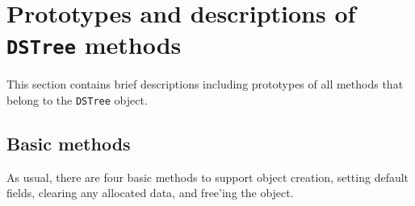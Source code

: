 \par
\section{Prototypes and descriptions of {\tt DSTree} methods}
\label{section:DSTree:proto}
\par
This section contains brief descriptions including prototypes
of all methods that belong to the {\tt DSTree} object.
\par
\subsection{Basic methods}
\label{subsection:DSTree:proto:basics}
\par
As usual, there are four basic methods to support object creation,
setting default fields, clearing any allocated data, and free'ing
the object.
\par
